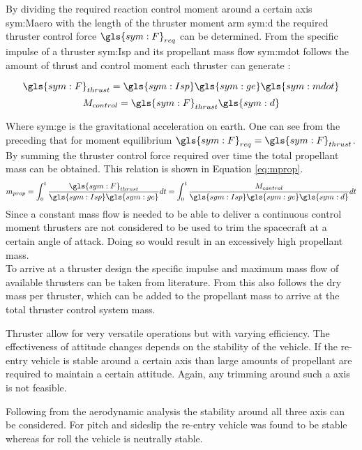By dividing the required reaction control moment around a certain axis \gls{sym:Maero} with the length of the thruster moment arm \gls{sym:d} the required thruster control force $\gls{sym:F}_{req}$ can be determined. From the specific impulse of a thruster \gls{sym:Isp} and its propellant mass flow \gls{sym:mdot} follows the amount of thrust and control moment each thruster can generate \cite{Allen2012}:
\begin{multicols}{2}
\begin{equation}
\gls{sym:F}_{thrust}=\gls{sym:Isp}\gls{sym:ge}\gls{sym:mdot}
\label{eq:Fthrust}
\end{equation}
\begin{equation} \label{eq:mcontrol}
M_{control}=\gls{sym:F}_{thrust}\gls{sym:d}
\end{equation}
\end{multicols}
Where \gls{sym:ge} is the gravitational acceleration on earth. One can see from the preceding that for moment equilibrium $\gls{sym:F}_{req}=\gls{sym:F}_{thrust}$. By summing the thruster control force required over time the total propellant mass can be obtained. This relation is shown in Equation \ref{eq:mprop}.
\begin{equation}
m_{prop}=\int_{0}^{t} \frac{\gls{sym:F}_{thrust}}{\gls{sym:Isp}\gls{sym:ge}} dt = \int_{0}^{t} \frac{M_{control}}{\gls{sym:Isp}\gls{sym:ge}\gls{sym:d}} dt
\label{eq:mprop}
\end{equation}
Since a constant mass flow is needed to be able to deliver a continuous control moment thrusters are not considered to be used to trim the spacecraft at a certain angle of attack. Doing so would result in an excessively high propellant mass. \\
To arrive at a thruster design the specific impulse and maximum mass flow of available thrusters can be taken from literature. From this also follows the dry mass per thruster, which can be added to the propellant mass to arrive at the total thruster control system mass.

Thruster allow for very versatile operations but with varying efficiency. The effectiveness of attitude changes depends on the stability of the vehicle. If the re-entry vehicle is stable around a certain axis than large amounts of propellant are required to maintain a certain attitude. Again, any trimming around such a axis is not feasible.

Following from the aerodynamic analysis the stability around all three axis can be considered. For pitch and sideslip the re-entry vehicle was found to be stable whereas for roll the vehicle is neutrally stable. 

